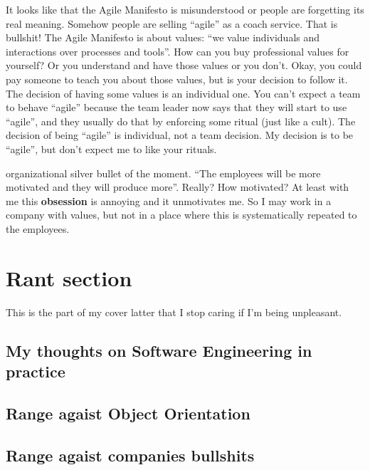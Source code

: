 \documentclass[11pt,a4paper,sans]{moderncv}
\begin{document}
It looks like that the Agile Manifesto is misunderstood or people are
forgetting its real meaning. Somehow people are selling ``agile'' as a
coach service. That is bullshit! The Agile Manifesto is about values:
``we value individuals and interactions over processes and tools''.
How can you buy professional values for yourself? Or you understand
and have those values or you don't. Okay, you could pay someone to
teach you about those values, but is your decision to follow it. The
decision of having some values is an individual one. You can't expect
a team to behave ``agile'' because the team leader now says that they
will start to use ``agile'', and they usually do that by enforcing
some ritual (just like a cult).  The decision of being ``agile'' is
individual, not a team decision.  My decision is to be ``agile'', but
don't expect me to like your rituals.

organizational silver bullet of the moment. ``The employees will be
more motivated and they will produce more''.  Really? How
motivated? At least with me this \textbf{obsession} is annoying and it
unmotivates me.  So I may work in a company with values, but not in a
place where this is systematically repeated to the employees.


\section{Rant section}
This is the part of my cover latter that I stop caring if I'm being unpleasant.

\subsection{My thoughts on Software Engineering in practice}

\subsection{Range agaist Object Orientation}

\subsection{Range agaist companies bullshits}
\end{document}
